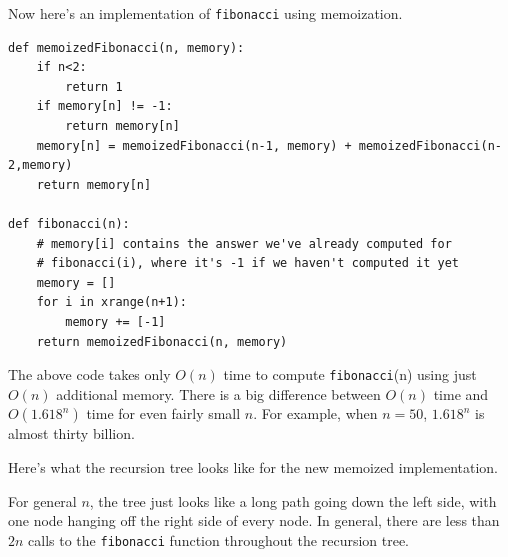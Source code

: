 \documentclass[11pt]{article}
\begin{document}
Now here's an implementation of \texttt{fibonacci} using memoization.

\begin{verbatim}
def memoizedFibonacci(n, memory):
    if n<2:
        return 1
    if memory[n] != -1:
        return memory[n]
    memory[n] = memoizedFibonacci(n-1, memory) + memoizedFibonacci(n-2,memory)
    return memory[n]

def fibonacci(n):
    # memory[i] contains the answer we've already computed for
    # fibonacci(i), where it's -1 if we haven't computed it yet
    memory = []
    for i in xrange(n+1):
        memory += [-1]
    return memoizedFibonacci(n, memory)
\end{verbatim}

The above code takes only $O(n)$ time to compute \texttt{fibonacci}(n)
using just $O(n)$ additional memory.  There is a big difference
between $O(n)$ time and $O(1.618^n)$ time for even fairly small $n$.
For example, when $n=50$, $1.618^n$ is almost thirty billion.

Here's what the recursion tree
looks like for the new memoized implementation.

\begin{figure}[!!h]
\begin{center}
\end{center}
\end{figure}

For general $n$, the tree just looks like a long path going down the
left side, with one node hanging off the right side of every node.  In
general, there are less than $2n$ calls to the \texttt{fibonacci}
function throughout the recursion tree.
\end{document}
